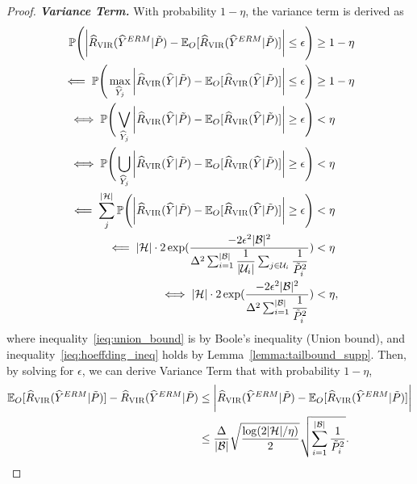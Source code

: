 \begin{proof}
\textbf{\emph{Variance Term.}} With probability $1-\eta$, the variance term is derived as
%
\begin{align}
    \mathbb{P} \Bigg( \bigg| \hat{R}_{\textsc{VIR}} (\hat{Y}^{ERM} | \Tilde{P}) - \mathbb{E}_{O} [\hat{R}_{\textsc{VIR}} (\hat{Y}^{ERM} | \Tilde{P})] \bigg| \leq \epsilon \Bigg) &\geq 1 - \eta \nonumber \\
    \impliedby \mathbb{P} \Bigg( \max_{\hat{Y}_{j}} \bigg| \hat{R}_{\textsc{VIR}} (\hat{Y} | \Tilde{P}) - \mathbb{E}_{O} [\hat{R}_{\textsc{VIR}} (\hat{Y} | \Tilde{P})] \bigg| \leq \epsilon \Bigg) &\geq 1 - \eta \nonumber \\
    \iff \mathbb{P} \Bigg( \bigvee_{\hat{Y}_{j}} \bigg| \hat{R}_{\textsc{VIR}} (\hat{Y} | \Tilde{P}) - \mathbb{E}_{O} [\hat{R}_{\textsc{VIR}} (\hat{Y} | \Tilde{P})] \bigg| \geq \epsilon \Bigg) &< \eta \nonumber \\
    \iff \mathbb{P} \Bigg( \bigcup_{\hat{Y}_{j}} \bigg| \hat{R}_{\textsc{VIR}} (\hat{Y} | \Tilde{P}) - \mathbb{E}_{O} [\hat{R}_{\textsc{VIR}} (\hat{Y} | \Tilde{P})] \bigg| \geq \epsilon \Bigg) &< \eta \nonumber \\
    \impliedby \sum_{j}^{|\mathcal{H}|} \mathbb{P} \Bigg( \bigg| \hat{R}_{\textsc{VIR}} (\hat{Y} | \Tilde{P}) - \mathbb{E}_{O} [\hat{R}_{\textsc{VIR}} (\hat{Y} | \Tilde{P})] \bigg| \geq \epsilon \Bigg) &< \eta \label{ieq:union_bound} \\
    \impliedby |\mathcal{H}| \cdot 2 \exp (\dfrac{-2 \epsilon^{2} |\mathcal{B}|^{2}}{\Delta^{2} \sum_{i=1}^{|\mathcal{B}|} \dfrac{1}{|\mathcal{U}_{i}|} \sum_{j \in \mathcal{U}_{i}} \dfrac{1}{\Tilde{P}_{i}^{2}}}) &< \eta \label{ieq:hoeffding_ineq} \\ 
    \iff |\mathcal{H}| \cdot 2 \exp (\dfrac{-2 \epsilon^{2} |\mathcal{B}|^{2}}{\Delta^{2} \sum_{i=1}^{|\mathcal{B}|} \dfrac{1}{\Tilde{P}_{i}^{2}}}) &< \eta, \nonumber
\end{align}
%
where inequality~\eqref{ieq:union_bound} is by Boole's inequality (Union bound), and inequality~\eqref{ieq:hoeffding_ineq} holds by Lemma~\ref{lemma:tailbound_supp}. Then, by solving for $\epsilon$, we can derive Variance Term that with probability $1 - \eta$,
%
\begin{align*}
    \mathbb{E}_{O} [\hat{R}_{\textsc{VIR}} (\hat{Y}^{ERM} | \Tilde{P})] - \hat{R}_{\textsc{VIR}} (\hat{Y}^{ERM} | \Tilde{P}) &\leq \bigg| \hat{R}_{\textsc{VIR}} (\hat{Y}^{ERM} | \Tilde{P}) - \mathbb{E}_{O} [\hat{R}_{\textsc{VIR}} (\hat{Y}^{ERM} | \Tilde{P})] \bigg| \\
    &\leq \dfrac{\Delta}{|\mathcal{B}|} \sqrt{\dfrac{\log (2 |\mathcal{H}| / \eta)}{2}} \sqrt{\sum_{i=1}^{|\mathcal{B}|} \dfrac{1}{\Tilde{P}_{i}^{2}}}.
\end{align*}
%


\end{proof}
